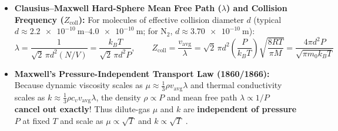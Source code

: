 \begin{formulacard}
\par\smallskip\noindent
{}
\begin{itemize}
  \item \textbf{Clausius--Maxwell Hard-Sphere Mean Free Path ($\lambda$) and Collision Frequency ($Z_{\mathrm{coll}}$):} For molecules of effective collision diameter $d$ (typical $d \approx \SIrange{2.2e-10}{4.0e-10}{\meter}$; for $\mathrm{N_2}$, $d \approx \SI{3.70e-10}{\meter}$):
  \begin{equation}\label{eq:06:mfp}
    \boxed{\lambda = \frac{1}{\sqrt{2}\,\pi d^2 (N/V)} = \frac{k_B T}{\sqrt{2}\,\pi d^2 P}}, \qquad Z_{\mathrm{coll}} = \frac{v_{\mathrm{avg}}}{\lambda} = \sqrt{2}\,\pi d^2 \left(\frac{P}{k_B T}\right)\sqrt{\frac{8RT}{\pi M}} = \frac{4\pi d^2 P}{\sqrt{\pi m_0 k_B T}}
  \end{equation}
  \item \textbf{Maxwell's Pressure-Independent Transport Law (1860/1866):} Because dynamic viscosity scales as $\mu \approx \frac{1}{3}\rho v_{\mathrm{avg}}\lambda$ and thermal conductivity scales as $k \approx \frac{1}{3}\rho c_v v_{\mathrm{avg}}\lambda$, the density $\rho \propto P$ and mean free path $\lambda \propto 1/P$ \textbf{cancel out exactly}! Thus dilute-gas $\mu$ and $k$ are \textbf{independent of pressure $P$} at fixed $T$ and scale as $\mu \propto \sqrt{T}$ and $k \propto \sqrt{T}$ .
\end{itemize}
\end{formulacard}

